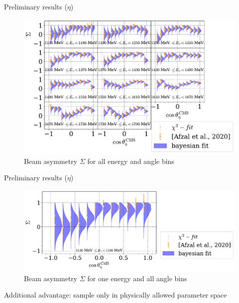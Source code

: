 \documentclass[11pt,aspectratio=169,dvipsnames]{beamer}
\begin{document}
\begin{frame}{Preliminary results ($\eta$)}
	\begin{figure}
		\centering
		\includegraphics[width=.79\linewidth]{../bayes/realdeal/sigma_eta_alt.pdf}
		\caption*{Beam asymmetry $\Sigma$ for all energy and angle bins}
	\end{figure}
\end{frame}
\begin{frame}{Preliminary results ($\eta$)}
	\begin{figure}
		\centering
		\includegraphics[width=\linewidth]{sigma_eta_bin.pdf}
		\caption*{Beam asymmetry $\Sigma$ for one energy and all angle bins}
	\end{figure}
Additional advantage: sample only in physically allowed parameter space
\end{frame}
\end{document}
